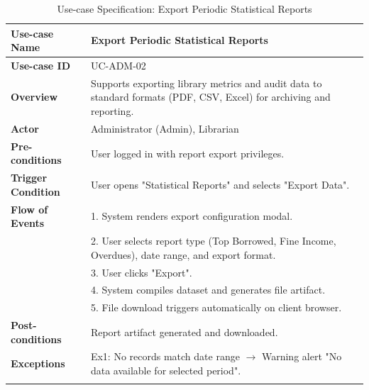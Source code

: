 \newpage
\begin{longtable}{|p{3.5cm}|p{11.5cm}|}
    \hline
    \textbf{Use-case Name} & \textbf{Export Periodic Statistical Reports} \\
    \hline
    \textbf{Use-case ID} & UC-ADM-02 \\
    \hline
    \textbf{Overview} & Supports exporting library metrics and audit data to standard formats (PDF, CSV, Excel) for archiving and reporting. \\
    \hline
    \textbf{Actor} & Administrator (Admin), Librarian \\
    \hline
    \textbf{Pre-conditions} & User logged in with report export privileges. \\
    \hline
    \textbf{Trigger Condition} & User opens "Statistical Reports" and selects "Export Data". \\
    \hline
    \textbf{Flow of Events} & 
    1. System renders export configuration modal.\\ 
 & 
    2. User selects report type (Top Borrowed, Fine Income, Overdues), date range, and export format.\\ 
 & 
    3. User clicks "Export".\\ 
 & 
    4. System compiles dataset and generates file artifact.\\ 
 & 
    5. File download triggers automatically on client browser. \\
    \hline
    \textbf{Post-conditions} & Report artifact generated and downloaded. \\
    \hline
    \textbf{Exceptions} & 
    Ex1: No records match date range $\rightarrow$ Warning alert "No data available for selected period". \\
    \hline
    \caption{Use-case Specification: Export Periodic Statistical Reports} \\
\end{longtable}

